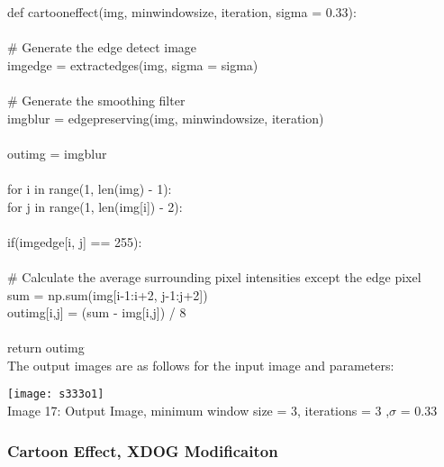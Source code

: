 \documentclass{article}
\begin{document}
	\noindent def cartoon\textunderscore effect(img, min\textunderscore window\textunderscore size, iteration, sigma = 0.33):\\
	\\
	\indent \# Generate the edge detect image\\
	\indent img\textunderscore edge = extract\textunderscore edges(img, sigma = sigma)\\
	\\
	\indent \# Generate the smoothing filter\\
	\indent img\textunderscore blur = edge\textunderscore preserving(img, min\textunderscore window\textunderscore size, iteration)\\
	\\
	\indent out\textunderscore img = img\textunderscore blur\\
	\\
	\indent for i in range(1, len(img) - 1):\\
	\indent \indent for j in range(1, len(img[i]) - 2):\\
	\\
	\indent \indent \indent if(img\textunderscore edge[i, j] == 255):\\
	\\
	\indent \indent \indent \indent \# Calculate the average surrounding pixel intensities except the edge pixel\\
	\indent \indent \indent \indent sum = np.sum(img[i-1:i+2, j-1:j+2])\\
	\indent \indent \indent \indent out\textunderscore img[i,j] = (sum - img[i,j]) / 8\\
	\\
	\indent return out\textunderscore img\\

	The output images are as follows for the input image and parameters:\\
	
	\begin{center}
		
		\texttt{[image: s333o1]}\\
		Image 17: Output Image, minimum window size = 3, iterations = 3 ,$\sigma$ = 0.33\\
		
	\end{center}
	
	\subsubsection{Cartoon Effect, XDOG Modificaiton}
	
\end{document}
